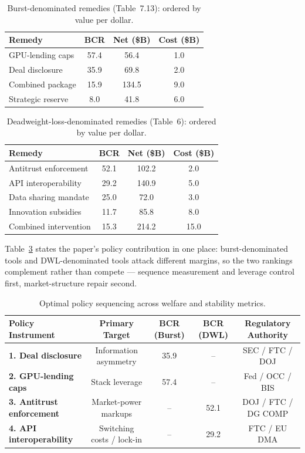 \documentclass[11pt,a4paper]{article}
\begin{document}
\begin{table}[htbp]
\centering
\caption{Burst-denominated remedies (Table~7.13): ordered by value per dollar.}
    \label{tab:16a-burstdenominated-remedies-table713}
\begin{tabular}{lccc}
\toprule
Remedy & BCR & Net (\$B) & Cost (\$B) \\
\midrule
GPU-lending caps & 57.4 & 56.4 & 1.0 \\
Deal disclosure & 35.9 & 69.8 & 2.0 \\
Combined package & 15.9 & 134.5 & 9.0 \\
Strategic reserve & 8.0 & 41.8 & 6.0 \\
\bottomrule
\end{tabular}
\end{table}

\begin{table}[htbp]
\centering
\caption{Deadweight-loss-denominated remedies (Table~6): ordered by value per dollar.}
    \label{tab:16b-deadweightlossdenominated-remedies-table}
\begin{tabular}{lccc}
\toprule
Remedy & BCR & Net (\$B) & Cost (\$B) \\
\midrule
Antitrust enforcement & 52.1 & 102.2 & 2.0 \\
API interoperability & 29.2 & 140.9 & 5.0 \\
Data sharing mandate & 25.0 & 72.0 & 3.0 \\
Innovation subsidies & 11.7 & 85.8 & 8.0 \\
\midrule
Combined intervention & 15.3 & 214.2 & 15.0 \\
\bottomrule
\end{tabular}
\end{table}

Table~\ref{tab:policy-summary} states the paper's policy contribution in one
place: burst-denominated tools and DWL-denominated tools attack different
margins, so the two rankings complement rather than compete --- sequence
measurement and leverage control first, market-structure repair second.

\begin{table}[htbp]
\centering
\caption{Optimal policy sequencing across welfare and stability metrics.}
\label{tab:policy-summary}
\small
\begin{tabular}{lcccc}
\toprule
Policy Instrument & Primary Target & BCR (Burst) & BCR (DWL) & Regulatory Authority \\
\midrule
\textbf{1. Deal disclosure} & Information asymmetry & 35.9 & -- & SEC / FTC / DOJ \\
\textbf{2. GPU-lending caps} & Stack leverage & 57.4 & -- & Fed / OCC / BIS \\
\textbf{3. Antitrust enforcement} & Market-power markups & -- & 52.1 & DOJ / FTC / DG COMP \\
\textbf{4. API interoperability} & Switching costs / lock-in & -- & 29.2 & FTC / EU DMA \\
\bottomrule
\end{tabular}
\end{table}
\end{document}
